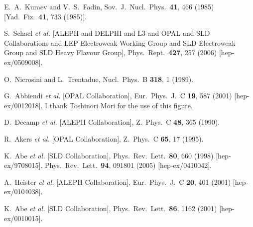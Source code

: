 \documentclass[12pt]{article}
\begin{document}
\begin{thebibliography}{99}
 E.~A.~Kuraev and V.~S.~Fadin,
  Sov.\ J.\ Nucl.\ Phys.\  {\bf 41}, 466 (1985)
  [Yad.\ Fiz.\  {\bf 41}, 733 (1985)].

  S.~Schael {\it et al.} [ALEPH and DELPHI and L3 and OPAL and SLD Collaborations and LEP Electroweak Working Group and SLD Electroweak Group and SLD Heavy Flavour Group],
  Phys.\ Rept.\  {\bf 427}, 257 (2006)
  [hep-ex/0509008].


 O.~Nicrosini and L.~Trentadue,
  Nucl.\ Phys.\ B {\bf 318}, 1 (1989).


 G.~Abbiendi {\it et al.} [OPAL Collaboration],
  Eur.\ Phys.\ J.\ C {\bf 19}, 587 (2001)
  [hep-ex/0012018].  I thank Toshinori Mori for the use of this figure.




 D.~Decamp {\it et al.} [ALEPH Collaboration],
  Z.\ Phys.\ C {\bf 48}, 365 (1990).


 R.~Akers {\it et al.} [OPAL Collaboration],
  Z.\ Phys.\ C {\bf 65}, 17 (1995).

 K.~Abe {\it et al.} [SLD Collaboration],
  Phys.\ Rev.\ Lett.\  {\bf 80}, 660 (1998)
  [hep-ex/9708015].
  Phys.\ Rev.\ Lett.\  {\bf 94}, 091801 (2005)
  [hep-ex/0410042].
 

 A.~Heister {\it et al.} [ALEPH Collaboration],
  Eur.\ Phys.\ J.\ C {\bf 20}, 401 (2001)
  [hep-ex/0104038].

 K.~Abe {\it et al.} [SLD Collaboration],
  Phys.\ Rev.\ Lett.\  {\bf 86}, 1162 (2001)
  [hep-ex/0010015].



\end{thebibliography}
\end{document}
